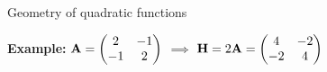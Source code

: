 \documentclass[11pt,compress,t,notes=noshow, xcolor=table]{beamer}
\begin{document}
\begin{vbframe}{Geometry of quadratic functions}
  
\textbf{Example:} $\mathbf{A} = \begin{pmatrix} 2 & -1 \\ -1 & 2\end{pmatrix}$ $\implies$ $\mathbf{H} = 2\mathbf{A} = \begin{pmatrix} 4 & -2 \\ -2 & 4\end{pmatrix}$




\end{vbframe}
\end{document}
